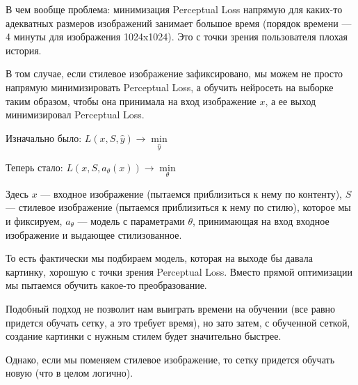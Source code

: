 В чем вообще проблема: минимизация Perceptual Loss напрямую для каких-то адекватных размеров изображений занимает большое время (порядок времени --- 4 минуты для изображения 1024x1024). Это с точки зрения пользователя плохая история.

В том случае, если стилевое изображение зафиксировано, мы можем не просто напрямую минимизировать Perceptual Loss, а обучить нейросеть на выборке таким образом, чтобы она принимала на вход изображение $x$, а ее выход минимизировал Perceptual Loss.

Изначально было: $L(x, S, \hat{y}) \rightarrow \min\limits_{\hat{y}}$

Теперь стало: $L(x, S, a_\theta(x)) \rightarrow \min\limits_{\theta}$

Здесь $x$ --- входное изображение (пытаемся приблизиться к нему по контенту), $S$ --- стилевое изображение (пытаемся приблизиться к нему по стилю), которое мы и фиксируем, $a_\theta$ --- модель с параметрами $\theta$, принимающая на вход входное изображение и выдающее стилизованное.

То есть фактически мы подбираем модель, которая на выходе бы давала картинку, хорошую с точки зрения Perceptual Loss. Вместо прямой оптимизации мы пытаемся обучить какое-то преобразование.

Подобный подход не позволит нам выиграть времени на обучении (все равно придется обучать сетку, а это требует время), но зато затем, с обученной сеткой, создание картинки с нужным стилем будет значительно быстрее.

Однако, если мы поменяем стилевое изображение, то сетку придется обучать новую (что в целом логично).